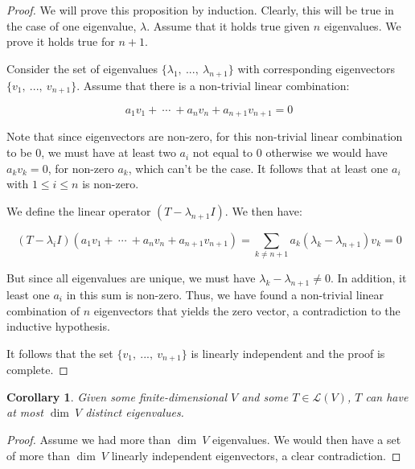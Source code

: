 \documentclass[10pt, oneside]{article}
\newtheorem{cor}{Corollary}
\begin{document}
    \begin{proof}

      We will prove this proposition by induction. Clearly, this will be true in the case of one eigenvalue, $\lambda$. Assume that
      it holds true given $n$ eigenvalues. We prove it holds true for $n + 1$.
      \newline

      Consider the set of eigenvalues $\{\lambda_1, \ ..., \ \lambda_{n + 1}\}$ with
      corresponding eigenvectors $\{v_1, \ ..., \ v_{n + 1}\}$.
      Assume that there is a non-trivial linear combination:

      $$a_{1} v_1 + \ \cdots \ + a_{n} v_{n} + a_{n + 1} v_{n + 1} = 0$$

      Note that since eigenvectors are non-zero, for this non-trivial linear combination to be $0$, we must have at least two $a_i$ not equal to
      $0$ otherwise we would have $a_k v_k = 0$, for non-zero $a_k$, which can't be the case. It follows that at least one $a_i$ with $1 \leq i \leq n$
      is non-zero.
      \newline

      We define the linear operator $(T - \lambda_{n + 1} I)$. We then have:

      $$(T - \lambda_i I)(a_1 v_1 + \ \cdots \ + a_n v_n + a_{n + 1} v_{n + 1}) = \displaystyle\sum_{k \neq n + 1} a_k (\lambda_k - \lambda_{n + 1}) v_k = 0$$

      But since all eigenvalues are unique, we must have $\lambda_k - \lambda_{n + 1} \neq 0$. In addition, it least one $a_i$ in this sum is non-zero. Thus,
      we have found a non-trivial linear combination of $n$ eigenvectors that yields the zero vector, a contradiction to the inductive hypothesis.
      \newline

      It follows that the set $\{v_1, \ ..., \ v_{n + 1}\}$ is linearly independent and the proof is complete.

    \end{proof}

    \begin{cor}
      Given some finite-dimensional
      $V$ and some $T \in \mathcal{L}(V)$, $T$ can have at most $\dim \ V$ distinct eigenvalues.
    \end{cor}

    \begin{proof}
      Assume we had more than $\dim \ V$ eigenvalues. We would then have a set of more than $\dim \ V$
      linearly independent eigenvectors, a clear contradiction.
      \end{proof}
\end{document}

